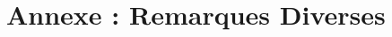 \setcounter{figure}{0} 
\setcounter{table}{0}
\setcounter{footnote}{0}
\setcounter{equation}{0}
\pagestyle{fancy}
\fancyhf{}
\renewcommand{\chaptermark}[1]{\markboth{\MakeUppercase{#1 }}{}}
\renewcommand{\sectionmark}[1]{\markright{\thesection~ #1}}
\fancyhead[RO]{\bfseries\rightmark}
\fancyhead[LE]{\bfseries\leftmark}
\fancyfoot[RO]{\thepage}
\fancyfoot[LE]{\thepage}
\renewcommand{\headrulewidth}{0.5pt}
\renewcommand{\footrulewidth}{0pt}

\makeatletter
\renewcommand\thefigure{A.\arabic{figure}}
\renewcommand\thetable{A.\arabic{table}} 
\makeatother

\chapter{Annexe : Remarques Diverses}
\graphicspath{{Annexe1/figures/}}


